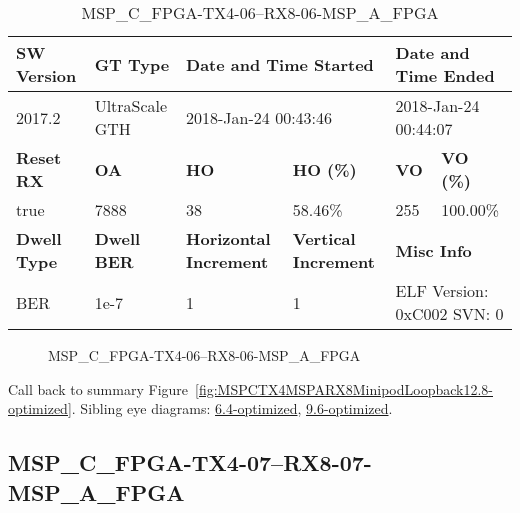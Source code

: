 \begin{table}[h]
\centering
\caption{MSP\_C\_FPGA-TX4-06--RX8-06-MSP\_A\_FPGA}
\label{tab:MSPCFPGATX406RX806MSPAFPGA12.8-optimized}
\begin{tabular}{@{}|l|l|l|l|l|l|@{}}
\toprule
\textbf{SW Version}                & \textbf{GT Type}   & \multicolumn{2}{l|}{\textbf{Date and Time Started}}            & \multicolumn{2}{l|}{\textbf{Date and Time Ended}}        \\ \midrule
2017.2                       & UltraScale GTH          & \multicolumn{2}{l|}{2018-Jan-24 00:43:46}                   & \multicolumn{2}{l|}{2018-Jan-24 00:44:07}               \\ \midrule
\textbf{Reset RX}                  & \textbf{OA} & \textbf{HO}   & \textbf{HO (\%)} & \textbf{VO} & \textbf{VO (\%)} \\ \midrule
true & 7888        & 38          & 58.46\%        & 255        & 100.00\%       \\ \midrule
\textbf{Dwell Type}                & \textbf{Dwell BER} & \textbf{Horizontal Increment} & \textbf{Vertical Increment}    & \multicolumn{2}{l|}{\textbf{Misc Info}}                  \\ \midrule
BER                            & 1e-7        & 1        & 1           & \multicolumn{2}{l|}{ELF Version: 0xC002 SVN: 0}                         \\ \bottomrule
\end{tabular}
\end{table}

\begin{figure}[h]
\caption{MSP\_C\_FPGA-TX4-06--RX8-06-MSP\_A\_FPGA} \label{fig:MSPCFPGATX406RX806MSPAFPGA12.8-optimized}
\end{figure}

Call back to summary Figure~\ref{fig:MSPCTX4MSPARX8MinipodLoopback12.8-optimized}.
Sibling eye diagrams: \hyperref[sec:MSPCFPGATX406RX806MSPAFPGA6.4-optimized]{6.4-optimized}, \hyperref[sec:MSPCFPGATX406RX806MSPAFPGA9.6-optimized]{9.6-optimized}.

\clearpage
\newpage


\subsection{MSP\_C\_FPGA-TX4-07--RX8-07-MSP\_A\_FPGA}\label{sec:MSPCFPGATX407RX807MSPAFPGA12.8-optimized}

